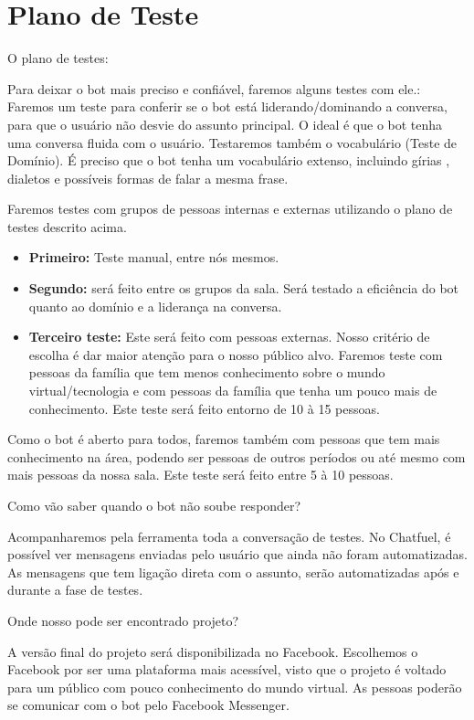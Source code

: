 \chapter{Plano de Teste}
\label{Plano de Teste}

O plano de testes:

Para deixar o bot mais preciso e confiável, faremos alguns testes com ele.:
Faremos um teste para conferir se o bot está liderando/dominando a conversa, para que o usuário não desvie do assunto principal. O ideal é que o bot tenha uma conversa fluida com o usuário. 
Testaremos também o vocabulário (Teste de Domínio). É preciso que o bot tenha um vocabulário extenso, incluindo gírias , dialetos e possíveis formas de falar a mesma frase. 

Faremos testes com grupos de pessoas internas e externas utilizando o plano de testes descrito acima. 
\begin{itemize}

\item \textbf {Primeiro:} Teste manual, entre nós mesmos. 

\item \textbf {Segundo:} será feito entre os grupos da sala. Será testado a eficiência do bot quanto ao domínio e a liderança na conversa. 

\item \textbf {Terceiro teste:} Este será feito com pessoas externas. Nosso critério de escolha é dar maior atenção para o nosso público alvo. Faremos teste com pessoas da família que tem menos conhecimento sobre o mundo virtual/tecnologia e com pessoas da família que tenha um pouco mais de conhecimento. Este teste será feito entorno de 10 à 15 pessoas.
\end{itemize}
Como o bot é aberto para todos, faremos também com pessoas que tem mais conhecimento na área, podendo ser pessoas de outros períodos ou até mesmo com mais pessoas da nossa sala. Este teste será feito entre 5 à 10 pessoas.

Como vão saber quando o bot não soube responder? 

Acompanharemos pela ferramenta toda a conversação de testes. No Chatfuel, é possível ver mensagens enviadas pelo usuário que ainda não foram automatizadas. As mensagens que tem ligação direta com o assunto, serão automatizadas após e durante a fase de testes. 

Onde nosso pode ser encontrado projeto? 

A versão final do projeto será disponibilizada no Facebook. Escolhemos o Facebook por  ser uma  plataforma mais acessível, visto  que o projeto é voltado para um público com pouco conhecimento do mundo virtual. As pessoas poderão se comunicar com o bot pelo Facebook Messenger.

